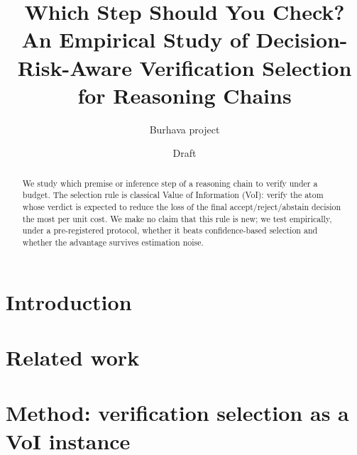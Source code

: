 \documentclass[11pt]{article}
\title{Which Step Should You Check? An Empirical Study of Decision-Risk-Aware Verification Selection for Reasoning Chains}
\author{Burhava project}
\date{Draft}
\begin{document}
\maketitle

\begin{abstract}
We study which premise or inference step of a reasoning chain to verify under a budget.
The selection rule is classical Value of Information (VoI): verify the atom whose
verdict is expected to reduce the loss of the final accept/reject/abstain decision
the most per unit cost. We make no claim that this rule is new; we test empirically,
under a pre-registered protocol, whether it beats confidence-based selection and
whether the advantage survives estimation noise. 
\end{abstract}

\section{Introduction}

\section{Related work}

\section{Method: verification selection as a VoI instance}
\end{document}
